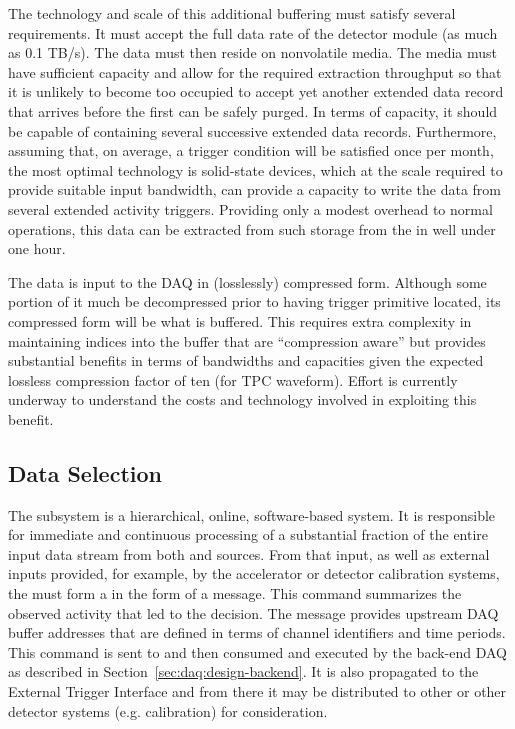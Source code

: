 The technology and scale of this additional buffering must satisfy several
requirements.  It must accept the full data rate of the detector module (as much as 0.1 TB/s).
The data must then reside on nonvolatile media. 
The media must have sufficient capacity and allow for the required extraction
throughput so that it is unlikely to become too occupied to accept yet another
extended data record that arrives before the first can be safely purged.
In terms of capacity, it should be capable of containing several successive
extended data records.
Furthermore, assuming that, on average, a  trigger condition will be
satisfied once per month, the most optimal technology is solid-state devices,
which at the scale required to provide suitable input bandwidth, can provide a
capacity to write the data from several extended activity triggers.
Providing only a modest overhead to normal operations, this data can be
extracted from such storage from the  in well under one hour.

The data is input to the DAQ in (losslessly) compressed form. 
Although some portion of it much be decompressed prior to having trigger
primitive located, its compressed form will be what is buffered. 
This requires extra complexity in maintaining indices into the buffer that are
``compression aware'' but provides substantial benefits in terms of bandwidths
and capacities given the expected lossless compression factor of ten (for TPC
waveform).
Effort is currently underway to understand the costs and technology involved in
exploiting this benefit.

\subsection{Data Selection}
\label{sec:daq:design-data-selection}

The  subsystem is a hierarchical, online, software-based system.
It is responsible for immediate and continuous processing of a substantial
fraction of the entire input data stream from both  and 
sources.
From that input, as well as external inputs provided, for example, by the
accelerator or detector calibration systems, the  must form a
 in the form of a  message.
This command summarizes the observed activity that led to the decision. 
The message provides upstream DAQ buffer addresses that are defined in terms of
channel identifiers and time periods.
This command is sent to and then consumed and executed by the back-end DAQ as
described in Section~\ref{sec:daq:design-backend}. 
It is also propagated to the External Trigger Interface and from there it may be
distributed to other  or other detector systems
(e.g. calibration) for consideration.

